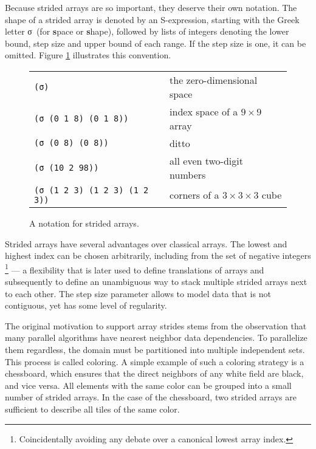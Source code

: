 Because strided arrays are so important, they deserve their own
notation. The shape of a strided array is denoted by an S-expression,
starting with the Greek letter σ \,(for \textbf{s}pace or \textbf{s}hape),
followed by lists of integers denoting the lower bound, step size and upper
bound of each range. If the step size is one, it can be omitted. Figure
\ref{fig:sigma-examples} illustrates this convention.

\begin{figure}[h]
  \begin{tabular}{ll}
    \texttt{(σ)}                         & \hspace{-1em} the zero-dimensional space \\
    \texttt{(σ (0 1 8) (0 1 8))}         & \hspace{-1em} index space of a $9 \times 9$ array \\
    \texttt{(σ (0 8) (0 8))}             & \hspace{-1em} ditto \\
    \texttt{(σ (10 2 98))}               & \hspace{-1em} all even two-digit numbers \\
    \texttt{(σ (1 2 3) (1 2 3) (1 2 3))} & \hspace{-1em} corners of a $3 \times 3 \times 3$ cube \\
  \end{tabular}
  \caption{A notation for strided arrays.}
  \label{fig:sigma-examples}
\end{figure}

Strided arrays have several advantages over classical arrays. The lowest
and highest index can be chosen arbitrarily, including from the set of
negative integers \footnote{Coincidentally avoiding any debate over a
  canonical lowest array index.} --- a flexibility that is later used to
define translations of arrays and subsequently to define an unambiguous way
to stack multiple strided arrays next to each other.  The step size
parameter allows to model data that is not contiguous, yet has some level
of regularity.

The original motivation to support array strides stems from the observation
that many parallel algorithms have nearest neighbor data dependencies. To
parallelize them regardless, the domain must be partitioned into multiple
independent sets. This process is called coloring. A simple example of such
a coloring strategy is a chessboard, which ensures that the direct
neighbors of any white field are black, and vice versa. All elements with
the same color can be grouped into a small number of strided arrays. In the
case of the chessboard, two strided arrays are sufficient to describe all
tiles of the same color.

